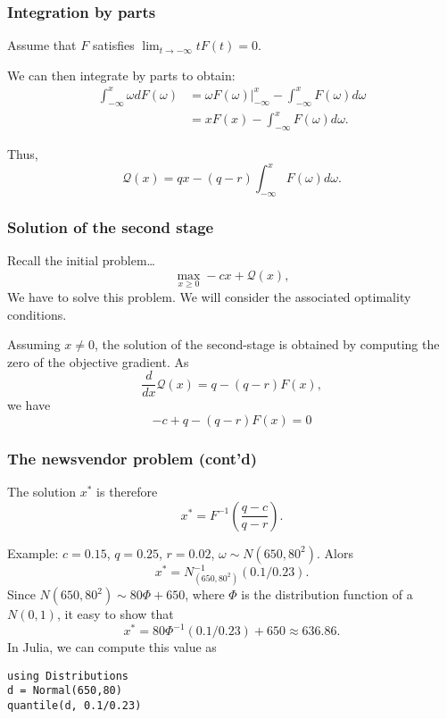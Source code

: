 \documentclass{beamer}
\begin{document}
\begin{frame}
\frametitle{Integration by parts}

Assume that $F$ satisfies $\lim_{t \rightarrow -\infty}
tF(t) = 0$.

\mbox{}

We can then integrate by parts to obtain:
\begin{align*}
\int_{-\infty}^x \omega dF(\omega) &= \omega F(\omega) |_{-\infty}^x -
\int_{-\infty}^x F(\omega) d\omega \\
&=  xF(x) - \int_{-\infty}^x F(\omega) d\omega.
\end{align*}

Thus,
\[
\mathcal{Q}(x) = qx - (q - r)\int_{-\infty}^x F(\omega)d\omega.
\]

\end{frame}

\begin{frame}
\frametitle{Solution of the second stage}

Recall the initial problem\ldots
\[
\max_{x \geq 0} -cx + \mathcal{Q}(x),
\]
We have to solve this problem.
We will consider the associated optimality conditions.

\mbox{}

Assuming $x \ne 0$, the solution of the second-stage is obtained by computing the zero of the objective gradient.
As
\[
\frac{d}{dx} \mathcal{Q}(x) = q - (q - r)F(x),
\]
we have
\[
-c + q - (q - r)F(x) = 0
\]

\end{frame}

\begin{frame}[fragile]
\frametitle{The newsvendor problem (cont'd)}

The solution $x^*$ is therefore
\[
x^* = F^{-1} \left( \frac{q-c}{q-r} \right).
\]

\mbox{}

Example: $c = 0.15$, $q = 0.25$, $r = 0.02$, $\omega \sim N(650, 80^2)$. Alors
\[
x^* = N^{-1}_{(650,80^2)}(0.1/0.23).
\]
Since $N(650, 80^2) \sim 80\Phi+650$, where $\Phi$ is the distribution function of a $N(0,1)$, it easy to show that
\[
x^* = 80\Phi^{-1}(0.1/0.23) + 650 \approx 636.86.
\]
In Julia, we can compute this value as
\begin{verbatim}
using Distributions
d = Normal(650,80)
quantile(d, 0.1/0.23)
\end{verbatim}

\end{frame}
\end{document}
